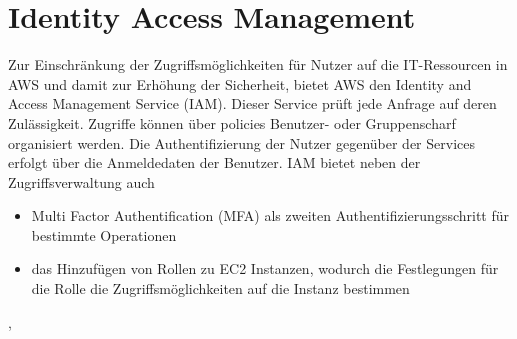 \section{Identity Access Management}
\label{sec:iam}
Zur Einschränkung der Zugriffsmöglichkeiten für Nutzer auf die IT-Ressourcen in AWS und damit zur Erhöhung der Sicherheit, bietet AWS den Identity and Access Management Service (IAM). Dieser Service prüft jede Anfrage auf deren Zulässigkeit. Zugriffe können über policies Benutzer- oder Gruppenscharf organisiert werden. Die Authentifizierung der Nutzer gegenüber der Services erfolgt über die Anmeldedaten der Benutzer. IAM bietet neben der Zugriffsverwaltung auch
\begin{itemize}
  \item Multi Factor Authentification (MFA) als zweiten Authentifizierungsschritt für bestimmte Operationen
  \item das Hinzufügen von Rollen zu EC2 Instanzen, wodurch die Festlegungen für die Rolle die Zugriffsmöglichkeiten auf die Instanz bestimmen
\end{itemize}
\cite{vliet:resilience}, \cite{wittig:awsinaction}

